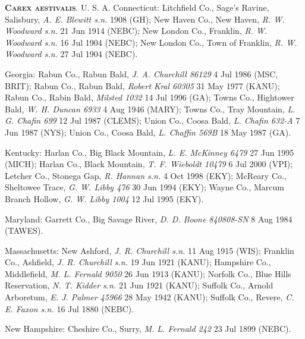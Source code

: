 \documentclass{article}
\begin{document}
\textbf{\textsc{Carex aestivalis}}. U. S. A. 
Connecticut:
Litchfield Co., Sage's Ravine, Salisbury, \textit{A. E. Blewitt s.n.} 1908 (GH);
New Haven Co., New Haven, \textit{R. W. Woodward s.n.} 21 Jun 1914 (NEBC);
New London Co., Franklin, \textit{R. W. Woodward s.n.} 16 Jul 1904 (NEBC);
New London Co., Town of Franklin, \textit{R. W. Woodward s.n.} 27 Jul 1904 (NEBC).

Georgia:
Rabun Co., Rabun Bald, \textit{J. A. Churchill 86129} 4 Jul 1986 (MSC, BRIT);
Rabun Co., Rabun Bald, \textit{Robert Kral 60305} 31 May 1977 (KANU);
Rabun Co., Rabin Bald, \textit{Milsted 1032} 14 Jul 1996 (GA);
Towns Co., Hightower Bald, \textit{W. H. Duncan 6933} 4 Aug 1946 (MARY);
Towns Co., Tray Mountain, \textit{L. G. Chafin 699} 12 Jul 1987 (CLEMS);
Union Co., Coosa Bald, \textit{L. Chafin 632-A} 7 Jun 1987 (NYS);
Union Co., Coosa Bald, \textit{L. Chaffin 569B} 18 May 1987 (GA).

Kentucky:
Harlan Co., Big Black Mountain, \textit{L. E. McKinney 6479} 27 Jun 1995 (MICH);
Harlan Co., Black Mountain, \textit{T. F. Wieboldt 10479} 6 Jul 2000 (VPI);
Letcher Co., Stonega Gap, \textit{R. Hannan s.n.} 4 Oct 1998 (EKY);
McReary Co., Sheltowee Trace, \textit{G. W. Libby 476} 30 Jun 1994 (EKY);
Wayne Co., Marcum Branch Hollow, \textit{G. W. Libby 1004} 12 Jul 1995 (EKY).

Maryland:
Garrett Co., Big Savage River, \textit{D. D. Boone 840808-SN} 8 Aug 1984 (TAWES).

Massachusetts:
New Ashford, \textit{J. R. Churchill s.n.} 11 Aug 1915 (WIS);
Franklin Co., Ashfield, \textit{J. R. Churchill s.n.} 19 Jun 1921 (KANU);
Hampshire Co., Middlefield, \textit{M. L. Fernald 9050} 26 Jun 1913 (KANU);
Norfolk Co., Blue Hills Reservation, \textit{N. T. Kidder s.n.} 21 Jun 1921 (KANU);
Suffolk Co., Arnold Arboretum, \textit{E. J. Palmer 45966} 28 May 1942 (KANU);
Suffolk Co., Revere, \textit{C. E. Faxon s.n.} 16 Jul 1880 (NEBC).

New Hampshire:
Cheshire Co., Surry, \textit{M. L. Fernald 242} 23 Jul 1899 (NEBC).
\end{document}
